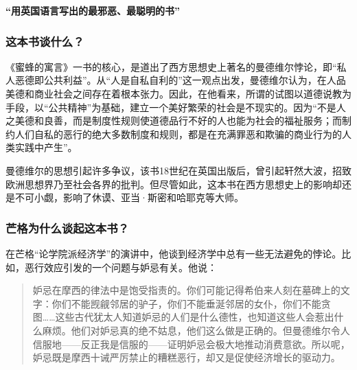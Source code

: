 \cleardoublepage
{}


\begin{BookSummaryBox}
\textbf{“用英国语言写出的最邪恶、最聪明的书”}
\par
\end{BookSummaryBox}

\subsubsection*{这本书谈什么？}

《蜜蜂的寓言》一书的核心，是道出了西方思想史上著名的曼德维尔悖论，即“私人恶德即公共利益”。从“人是自私自利的”这一观点出发，曼德维尔认为，在人品美德和商业社会之间存在着根本张力。因此，在他看来，所谓的试图以道德说教为手段，以“公共精神”为基础，建立一个美好繁荣的社会是不现实的。因为“不是人之美德和良善，而是制度性规则使道德品行不好的人也能为社会的福祉服务；而制约人们自私的恶行的绝大多数制度和规则，都是在充满罪恶和欺骗的商业行为的人类实践中产生”。
\par

曼德维尔的思想引起许多争议，该书18世纪在英国出版后，曾引起轩然大波，招致欧洲思想界乃至社会各界的批判。但尽管如此，这本书在西方思想史上的影响却还是不可小觑，影响了休谟、亚当·斯密和哈耶克等大师。
\par

\subsubsection*{芒格为什么谈起这本书？}

在芒格“论学院派经济学”的演讲中，他谈到经济学中总有一些无法避免的悖论。比如，恶行效应引发的一个问题与妒忌有关。他说：
\par

\begin{quotation}
妒忌在摩西的律法中是饱受指责的。你们可能记得希伯来人刻在墓碑上的文字：你们不能觊觎邻居的驴子，你们不能垂涎邻居的女仆，你们不能贪图……这些古代犹太人知道妒忌的人们是什么德性，也知道这些人会惹出什么麻烦。他们对妒忌真的绝不姑息，他们这么做是正确的。但曼德维尔令人信服地——反正我是信服的——证明妒忌会极大地推动消费意欲。所以呢，妒忌既是摩西十诫严厉禁止的糟糕恶行，却又是促使经济增长的驱动力。
\par
\end{quotation}

